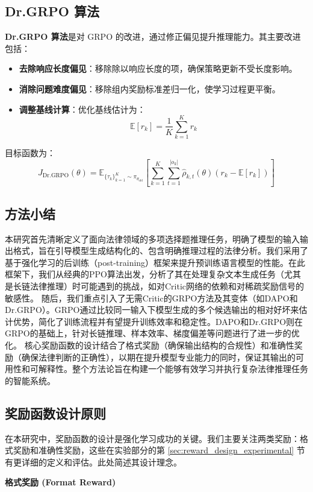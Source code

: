 \documentclass{pkuthesis}
\begin{document}
\subsection{Dr.GRPO 算法}
\textbf{Dr.GRPO 算法}\cite{liu2025understanding}是对 GRPO 的改进，通过修正偏见提升推理能力。其主要改进包括：
\begin{itemize}
    \item \textbf{去除响应长度偏见}：移除除以响应长度的项，确保策略更新不受长度影响。
    \item \textbf{消除问题难度偏见}：移除组内奖励标准差归一化，使学习过程更平衡。
    \item \textbf{调整基线计算}：优化基线估计为：
    \[
    \mathbb{E}[r_k] = \frac{1}{K} \sum_{k=1}^K r_k
    \]
\end{itemize}
目标函数为：
\[
J_{\text{Dr.GRPO}}(\theta) = \mathbb{E}_{\{\tau_k\}_{k=1}^K \sim \pi_{\theta_{\text{old}}}}\left[\sum_{k=1}^{K} \sum_{t=1}^{|o_k|} \hat{\rho}_{k,t}(\theta) (r_k - \mathbb{E}[r_k])\right]
\]

\subsection{方法小结}
本研究首先清晰定义了面向法律领域的多项选择题推理任务，明确了模型的输入输出格式，旨在引导模型生成结构化的、包含明确推理过程的法律分析。我们采用了基于强化学习的后训练（post-training）框架来提升预训练语言模型的性能。在此框架下，我们从经典的PPO算法出发，分析了其在处理复杂文本生成任务（尤其是长链法律推理）时可能遇到的挑战，如对Critic网络的依赖和对稀疏奖励信号的敏感性。
随后，我们重点引入了无需Critic的GRPO方法及其变体（如DAPO和Dr.GRPO）。GRPO通过比较同一输入下模型生成的多个候选输出的相对好坏来估计优势，简化了训练流程并有望提升训练效率和稳定性。DAPO和Dr.GRPO则在GRPO的基础上，针对长链推理、样本效率、梯度偏差等问题进行了进一步的优化。
核心奖励函数的设计结合了格式奖励（确保输出结构的合规性）和准确性奖励（确保法律判断的正确性），以期在提升模型专业能力的同时，保证其输出的可用性和可解释性。整个方法论旨在构建一个能够有效学习并执行复杂法律推理任务的智能系统。

\subsection{奖励函数设计原则}
在本研究中，奖励函数的设计是强化学习成功的关键。我们主要关注两类奖励：格式奖励和准确性奖励，这些在实验部分的第 \ref{sec:reward_design_experimental} 节有更详细的定义和评估。此处简述其设计理念。

\textbf{格式奖励 (Format Reward)}
\end{document}
